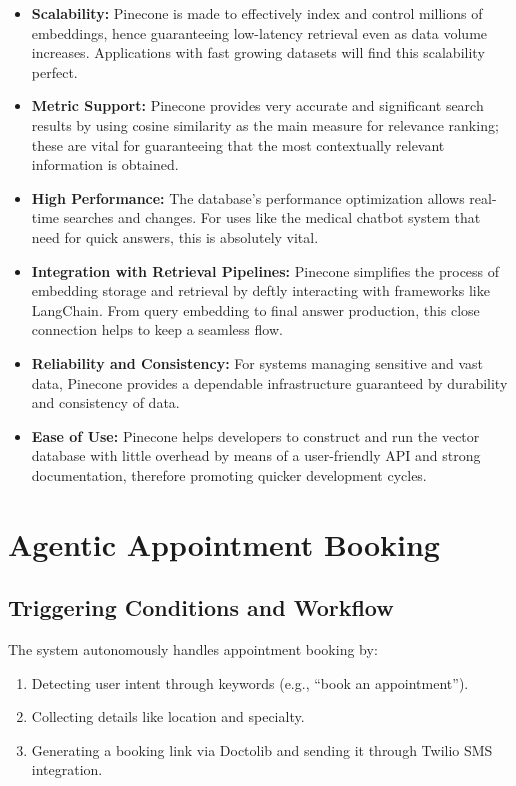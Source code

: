 \begin{itemize}[itemsep=2em]
    \item \textbf{Scalability:} Pinecone is made to effectively index and control millions of embeddings, hence guaranteeing low-latency retrieval even as data volume increases.  Applications with fast growing datasets will find this scalability perfect.
    \item \textbf{Metric Support:} Pinecone provides very accurate and significant search results by using cosine similarity as the main measure for relevance ranking; these are vital for guaranteeing that the most contextually relevant information is obtained.
    \item \textbf{High Performance:} The database's performance optimization allows real-time searches and changes.  For uses like the medical chatbot system that need for quick answers, this is absolutely vital.
    \item \textbf{Integration with Retrieval Pipelines:} Pinecone simplifies the process of embedding storage and retrieval by deftly interacting with frameworks like LangChain.  From query embedding to final answer production, this close connection helps to keep a seamless flow.
    \item \textbf{Reliability and Consistency:} For systems managing sensitive and vast data, Pinecone provides a dependable infrastructure guaranteed by durability and consistency of data.
    \item \textbf{Ease of Use:} Pinecone helps developers to construct and run the vector database with little overhead by means of a user-friendly API and strong documentation, therefore promoting quicker development cycles.
\end{itemize}


\section{Agentic Appointment Booking}
\label{sec:agentic_booking}

\subsection{Triggering Conditions and Workflow}
\label{subsec:booking_workflow}
The system autonomously handles appointment booking by:
\begin{enumerate}
    \item Detecting user intent through keywords (e.g., “book an appointment”).
    \item Collecting details like location and specialty.
    \item Generating a booking link via Doctolib and sending it through Twilio SMS integration.
\end{enumerate}


